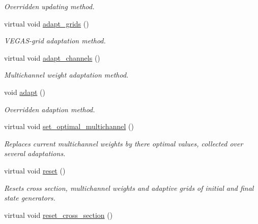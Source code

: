 \begin{DoxyCompactItemize}
\begin{DoxyCompactList}\small\item\em Overridden updating method. \end{DoxyCompactList}\item 
\hypertarget{a00441_a8dadcf764ebcfca1e05156866e24f81c}{virtual void \hyperlink{a00441_a8dadcf764ebcfca1e05156866e24f81c}{adapt\-\_\-grids} ()}\label{a00441_a8dadcf764ebcfca1e05156866e24f81c}

\begin{DoxyCompactList}\small\item\em V\-E\-G\-A\-S-\/grid adaptation method. \end{DoxyCompactList}\item 
\hypertarget{a00441_aee5d39cdf937f3399d682e95d19f1fb6}{virtual void \hyperlink{a00441_aee5d39cdf937f3399d682e95d19f1fb6}{adapt\-\_\-channels} ()}\label{a00441_aee5d39cdf937f3399d682e95d19f1fb6}

\begin{DoxyCompactList}\small\item\em Multichannel weight adaptation method. \end{DoxyCompactList}\item 
\hypertarget{a00441_aaa93653cd53498e56183fa5857b396ea}{void \hyperlink{a00441_aaa93653cd53498e56183fa5857b396ea}{adapt} ()}\label{a00441_aaa93653cd53498e56183fa5857b396ea}

\begin{DoxyCompactList}\small\item\em Overridden adaption method. \end{DoxyCompactList}\item 
virtual void \hyperlink{a00441_a1cf371f098235bf3735048b78ee3bb09}{set\-\_\-optimal\-\_\-multichannel} ()
\begin{DoxyCompactList}\small\item\em Replaces current multichannel weights by there optimal values, collected over several adaptations. \end{DoxyCompactList}\item 
virtual void \hyperlink{a00441_a205f3c5d763897f3d031ded8e0b99dc0}{reset} ()
\begin{DoxyCompactList}\small\item\em Resets cross section, multichannel weights and adaptive grids of initial and final state generators. \end{DoxyCompactList}\item 
\hypertarget{a00441_afb4972f1613f2f5055347190eba6ebf3}{virtual void \hyperlink{a00441_afb4972f1613f2f5055347190eba6ebf3}{reset\-\_\-cross\-\_\-section} ()}\label{a00441_afb4972f1613f2f5055347190eba6ebf3}


\end{DoxyCompactItemize}

